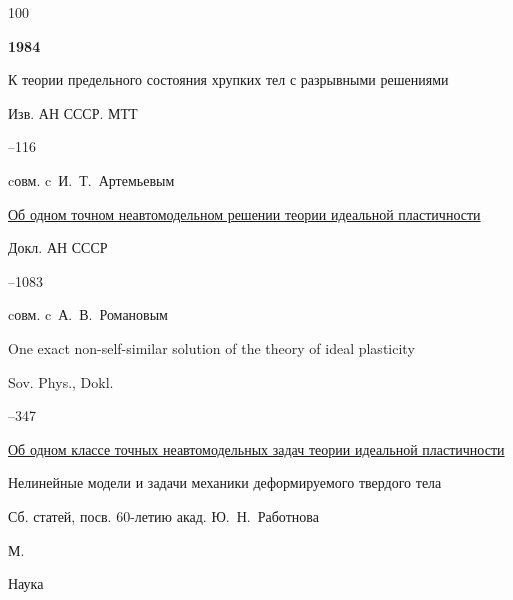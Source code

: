 \begin{thebibliography}{100}



\item[] \centerline{\bf 1984}




\paper  К теории предельного состояния хрупких тел с разрывными решениями 

\jour  Изв. АН СССР. МТТ



–116 

\miscnote cовм. c~И.~Т.~Артемьевым




\paper \href{https://zbmath.org/?q=an:0579.73031}{Об одном точном неавтомодельном решении теории идеальной пластичности}


\jour Докл. АН СССР




–1083 

\miscnote cовм. c~А.~В.~Романовым

\transl


\paper One exact non-self-similar solution of the theory of ideal plasticity

\jour Sov. Phys., Dokl.


--347 


 


\paper \href{https://zbmath.org/?q=an:0588.73066}{Об одном классе точных неавтомодельных задач теории идеальной пластичности}


\inbook Нелинейные модели и задачи механики деформируемого твердого тела

\bookinfo Сб. статей, посв. 60-летию акад. Ю.~Н.~Работнова

\publaddr М.

\publ Наука



\end{thebibliography}

